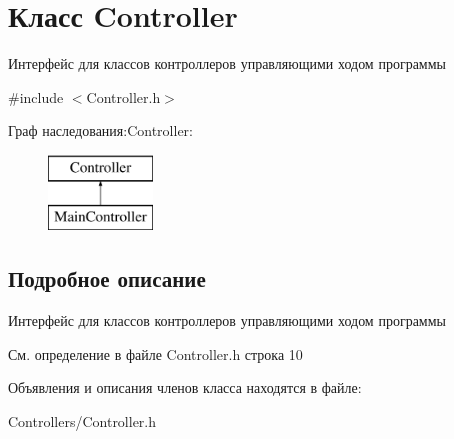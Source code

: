 \hypertarget{class_controller}{}\section{Класс Controller}
\label{class_controller}


Интерфейс для классов контроллеров управляющими ходом программы  




{\ttfamily \#include $<$Controller.\+h$>$}

Граф наследования\+:Controller\+:\begin{figure}[H]
\begin{center}
\leavevmode
\includegraphics[height=2.000000cm]{class_controller}
\end{center}
\end{figure}


\subsection{Подробное описание}
Интерфейс для классов контроллеров управляющими ходом программы 

См. определение в файле Controller.\+h строка 10



Объявления и описания членов класса находятся в файле\+:\begin{DoxyCompactItemize}
\item 
Controllers/Controller.\+h\end{DoxyCompactItemize}
